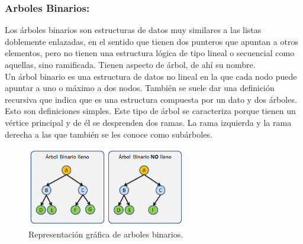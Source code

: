 \documentclass[12pt,letterpaper]{article}
\begin{document}
\subsubsection{Arboles Binarios:}
Los árboles binarios son estructuras de datos muy similares a las listas doblemente enlazadas, en el sentido que tienen dos punteros que apuntan a otros elementos, pero no tienen una estructura lógica de tipo lineal o secuencial como aquellas, sino ramificada.  Tienen aspecto de árbol, de ahí­ su nombre.\\Un árbol binario es una estructura de datos no lineal en la que cada nodo puede apuntar a uno o máximo a dos nodos. También se suele dar una definición recursiva que indica que es una estructura compuesta por un dato y dos árboles. Esto son definiciones simples. Este tipo de árbol se caracteriza porque tienen un vértice principal y de él se desprenden dos ramas. La rama izquierda y la rama derecha a las que también se les conoce como subárboles.
\vspace*{-0.1in}
\begin{figure}[h]
\begin{center}
\includegraphics[width=7cm]{./Imagenes/arbolbinario.png}
\caption{Representación gráfica de arboles binarios.}
\label{rg5}
\end{center}
\end{figure}
\end{document}

